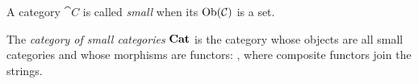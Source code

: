 
\begin{definition}
A category $\cat{C}$ is called \emph{small} when its $\operatorname{Ob}(\mathcal{C})$ is a set. 
\end{definition}
\begin{definition}
The \emph{category of small categories} $\boldsymbol{\mathrm{Cat}}$ is the category whose objects are %
all small categories and whose morphisms are functors:
, where composite functors join the strings.
\end{definition}



